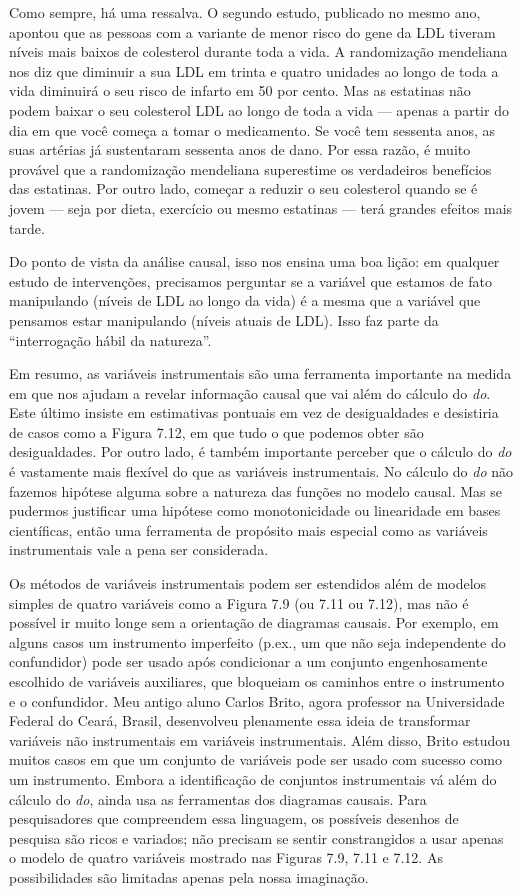 \documentclass[11pt,a5paper,twoside]{book}
\begin{document}
Como sempre, há uma ressalva. O segundo estudo, publicado no mesmo ano, apontou que as pessoas com a variante de menor risco do gene da LDL tiveram níveis mais baixos de colesterol durante toda a vida. A randomização mendeliana nos diz que diminuir a sua LDL em trinta e quatro unidades ao longo de toda a vida diminuirá o seu risco de infarto em 50 por cento. Mas as estatinas não podem baixar o seu colesterol LDL ao longo de toda a vida — apenas a partir do dia em que você começa a tomar o medicamento. Se você tem sessenta anos, as suas artérias já sustentaram sessenta anos de dano. Por essa razão, é muito provável que a randomização mendeliana superestime os verdadeiros benefícios das estatinas. Por outro lado, começar a reduzir o seu colesterol quando se é jovem — seja por dieta, exercício ou mesmo estatinas — terá grandes efeitos mais tarde.

Do ponto de vista da análise causal, isso nos ensina uma boa lição: em qualquer estudo de intervenções, precisamos perguntar se a variável que estamos de fato manipulando (níveis de LDL ao longo da vida) é a mesma que a variável que pensamos estar manipulando (níveis atuais de LDL). Isso faz parte da “interrogação hábil da natureza”.

Em resumo, as variáveis instrumentais são uma ferramenta importante na medida em que nos ajudam a revelar informação causal que vai além do cálculo do \textit{do}. Este último insiste em estimativas pontuais em vez de desigualdades e desistiria de casos como a Figura 7.12, em que tudo o que podemos obter são desigualdades. Por outro lado, é também importante perceber que o cálculo do \textit{do} é vastamente mais flexível do que as variáveis instrumentais. No cálculo do \textit{do} não fazemos hipótese alguma sobre a natureza das funções no modelo causal. Mas se pudermos justificar uma hipótese como monotonicidade ou linearidade em bases científicas, então uma ferramenta de propósito mais especial como as variáveis instrumentais vale a pena ser considerada.

Os métodos de variáveis instrumentais podem ser estendidos além de modelos simples de quatro variáveis como a Figura 7.9 (ou 7.11 ou 7.12), mas não é possível ir muito longe sem a orientação de diagramas causais. Por exemplo, em alguns casos um instrumento imperfeito (p.ex., um que não seja independente do confundidor) pode ser usado após condicionar a um conjunto engenhosamente escolhido de variáveis auxiliares, que bloqueiam os caminhos entre o instrumento e o confundidor. Meu antigo aluno Carlos Brito, agora professor na Universidade Federal do Ceará, Brasil, desenvolveu plenamente essa ideia de transformar variáveis não instrumentais em variáveis instrumentais. Além disso, Brito estudou muitos casos em que um conjunto de variáveis pode ser usado com sucesso como um instrumento. Embora a identificação de conjuntos instrumentais vá além do cálculo do \textit{do}, ainda usa as ferramentas dos diagramas causais. Para pesquisadores que compreendem essa linguagem, os possíveis desenhos de pesquisa são ricos e variados; não precisam se sentir constrangidos a usar apenas o modelo de quatro variáveis mostrado nas Figuras 7.9, 7.11 e 7.12. As possibilidades são limitadas apenas pela nossa imaginação.
\end{document}
